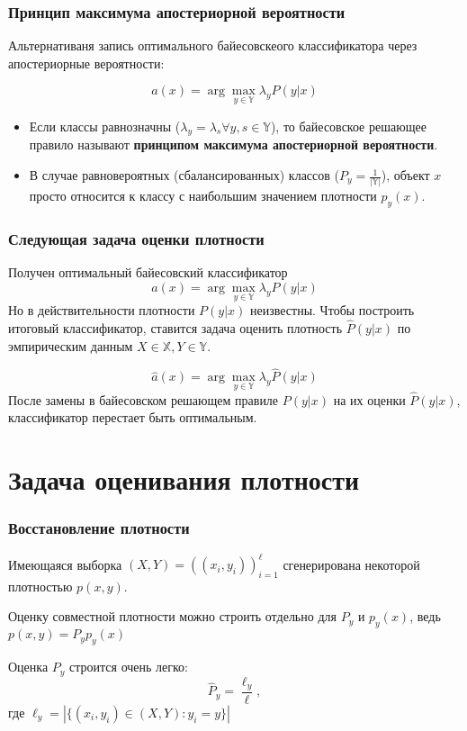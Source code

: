 \documentclass{beamer}
\begin{document}
	\begin{frame}
		\frametitle{Принцип максимума апостериорной вероятности}
		Альтернативаня запись оптимального байесовскеого классификатора через апостериорные вероятности:
		
		\[
		a(x) = \arg \max_{y \in \mathbb{Y}} \lambda_{y} P(y | x)
		\]
		
		\vspace{15pt}
		
		\begin{itemize}
		\item
		Если классы равнозначны ($\lambda_{y} = \lambda_{s} \forall y, s \in \mathbb{Y}$), то байесовское решающее правило называют \textbf{принципом максимума апостериорной вероятности}.
		
		\item
		В случае равновероятных (сбалансированных) классов ($P_y = \frac{1}{|\mathbb{Y}|}$), объект $x$ просто относится к классу с наибольшим значением плотности $p_y(x)$.
		\end{itemize}
	\end{frame}
	
	\begin{frame}
		\frametitle{Следующая задача оценки плотности}
		Получен оптимальный байесовский классификатор
		\[
		a(x) = \arg \max_{y \in \mathbb{Y}} \lambda_{y} P(y | x)
		\]
		Но в действительности плотности $P(y | x)$ неизвестны. Чтобы построить итоговый классификатор, ставится задача оценить плотность $\hat{P}(y | x)$ по эмпирическим данным $X \in \mathbb{X}, Y \in \mathbb{Y}$.
		
		\vspace{5pt}
		
		\[
		\hat{a}(x) = \arg \max_{y \in \mathbb{Y}} \lambda_{y} \hat{P}(y | x)
		\]
		После замены в байесовском решающем правиле $P(y | x)$ на их оценки $\hat{P}(y | x)$, классификатор перестает быть оптимальным.
	\end{frame}
	
	\section{Задача оценивания плотности}
	
	\begin{frame}
		\frametitle{Восстановление плотности}
		Имеющаяся выборка $(X, Y) = ((x_i, y_i))_{i=1}^{\ell}$ сгенерирована некоторой плотностью $p(x, y)$.
		
		\vspace{5pt}
		
		Оценку совместной плотности можно строить отдельно для $P_y$ и $p_y(x)$, ведь
		$p(x, y) = P_y p_y(x)$
		
		\vspace{15pt}
		
		Оценка $P_y$ строится очень легко:
		\[
		\hat{P}_y = \frac{\ell_y}{\ell},
		\]
		где $\ell_y = |\{(x_i, y_i) \in (X, Y) : y_i = y\}|$
	\end{frame}
		
\end{document}
